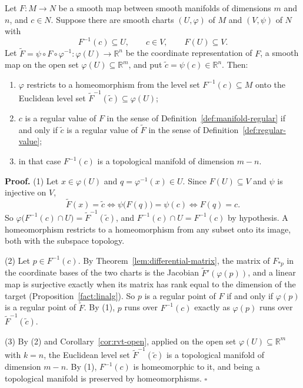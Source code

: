 \documentclass[11pt]{report}
\makeatletter
\newcounter{thmcounter}[section]
\renewenvironment{proof}[1][Proof]{\noindent\textbf{#1.} }{\hfill$\square$\par\vspace{5pt}}
\newcommand{\thmlabel}[1]{\edef\@currentlabel{\arabic{section}.\arabic{thmcounter}}\label{#1}}
\makeatother
\begin{document}
\begin{propbox}\thmlabel{prop:regular-one-chart}
Let $F : M \to N$ be a smooth map between smooth manifolds of dimensions $m$ and $n$, and $c \in N$. Suppose there are smooth charts $(U, \varphi)$ of $M$ and $(V, \psi)$ of $N$ with
\[
F^{-1}(c) \subseteq U, \qquad c \in V, \qquad F(U) \subseteq V .
\]
Let $\tilde F = \psi \circ F \circ \varphi^{-1} : \varphi(U) \to \mathbb{R}^n$ be the coordinate representation of $F$, a smooth map on the open set $\varphi(U) \subseteq \mathbb{R}^m$, and put $\tilde c = \psi(c) \in \mathbb{R}^n$. Then:
\begin{enumerate}
    \item $\varphi$ restricts to a homeomorphism from the level set $F^{-1}(c) \subseteq M$ onto the Euclidean level set $\tilde F^{-1}(\tilde c) \subseteq \varphi(U)$;
    \item $c$ is a regular value of $F$ in the sense of Definition~\ref{def:manifold-regular} if and only if $\tilde c$ is a regular value of $\tilde F$ in the sense of Definition~\ref{def:regular-value};
    \item in that case $F^{-1}(c)$ is a topological manifold of dimension $m - n$.
\end{enumerate}
\end{propbox}

\begin{proof}
(1) Let $x \in \varphi(U)$ and $q = \varphi^{-1}(x) \in U$. Since $F(U) \subseteq V$ and $\psi$ is injective on $V$,
\[
\tilde F(x) = \tilde c \iff \psi\big(F(q)\big) = \psi(c) \iff F(q) = c .
\]
So $\varphi\big(F^{-1}(c) \cap U\big) = \tilde F^{-1}(\tilde c)$, and $F^{-1}(c) \cap U = F^{-1}(c)$ by hypothesis. A homeomorphism restricts to a homeomorphism from any subset onto its image, both with the subspace topology.

(2) Let $p \in F^{-1}(c)$. By Theorem~\ref{lem:differential-matrix}, the matrix of $F_{*p}$ in the coordinate bases of the two charts is the Jacobian $\tilde F'(\varphi(p))$, and a linear map is surjective exactly when its matrix has rank equal to the dimension of the target (Proposition~\ref{fact:linalg}). So $p$ is a regular point of $F$ if and only if $\varphi(p)$ is a regular point of $\tilde F$. By (1), $p$ runs over $F^{-1}(c)$ exactly as $\varphi(p)$ runs over $\tilde F^{-1}(\tilde c)$.

(3) By (2) and Corollary~\ref{cor:rvt-open}, applied on the open set $\varphi(U) \subseteq \mathbb{R}^m$ with $k = n$, the Euclidean level set $\tilde F^{-1}(\tilde c)$ is a topological manifold of dimension $m - n$. By (1), $F^{-1}(c)$ is homeomorphic to it, and being a topological manifold is preserved by homeomorphisms.
\end{proof}
\end{document}
